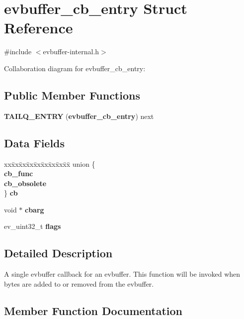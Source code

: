 \section{evbuffer\-\_\-cb\-\_\-entry \-Struct \-Reference}
\label{structevbuffer__cb__entry}


{\ttfamily \#include $<$evbuffer-\/internal.\-h$>$}



\-Collaboration diagram for evbuffer\-\_\-cb\-\_\-entry\-:
\subsection*{\-Public \-Member \-Functions}
\begin{DoxyCompactItemize}
\item 
{\bf \-T\-A\-I\-L\-Q\-\_\-\-E\-N\-T\-R\-Y} ({\bf evbuffer\-\_\-cb\-\_\-entry}) next
\end{DoxyCompactItemize}
\subsection*{\-Data \-Fields}
\begin{DoxyCompactItemize}
\item 
\begin{tabbing}
xx\=xx\=xx\=xx\=xx\=xx\=xx\=xx\=xx\=\kill
union \{\\
 {\bfseries cb\_func}\\
 {\bfseries cb\_obsolete}\\
\} {\bf cb}\\

\end{tabbing}\item 
void $\ast$ {\bf cbarg}
\item 
ev\-\_\-uint32\-\_\-t {\bf flags}
\end{DoxyCompactItemize}


\subsection{\-Detailed \-Description}
\-A single evbuffer callback for an evbuffer. \-This function will be invoked when bytes are added to or removed from the evbuffer. 

\subsection{\-Member \-Function \-Documentation}
